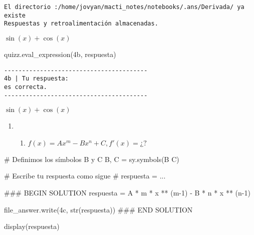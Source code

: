 \documentclass[
  letterpaper,
  DIV=11,
  numbers=noendperiod]{scrreprt}
\newenvironment{Shaded}{\begin{snugshade}}{\end{snugshade}}
\newcommand{\BuiltInTok}[1]{\textcolor[rgb]{0.00,0.23,0.31}{#1}}
\newcommand{\CommentTok}[1]{\textcolor[rgb]{0.37,0.37,0.37}{#1}}
\newcommand{\DecValTok}[1]{\textcolor[rgb]{0.68,0.00,0.00}{#1}}
\newcommand{\NormalTok}[1]{\textcolor[rgb]{0.00,0.23,0.31}{#1}}
\newcommand{\OperatorTok}[1]{\textcolor[rgb]{0.37,0.37,0.37}{#1}}
\newcommand{\RegionMarkerTok}[1]{\textcolor[rgb]{0.00,0.23,0.31}{#1}}
\newcommand{\StringTok}[1]{\textcolor[rgb]{0.13,0.47,0.30}{#1}}
\providecommand{\tightlist}{%
  \setlength{\itemsep}{0pt}\setlength{\parskip}{0pt}}\usepackage{longtable,booktabs,array}
\begin{document}
\begin{verbatim}
El directorio :/home/jovyan/macti_notes/notebooks/.ans/Derivada/ ya existe
Respuestas y retroalimentación almacenadas.
\end{verbatim}

$\displaystyle \sin{\left(x \right)} + \cos{\left(x \right)}$

\begin{Shaded}
\begin{Highlighting}[]
\NormalTok{quizz.eval\_expression(}\StringTok{\textquotesingle{}4b\textquotesingle{}}\NormalTok{, respuesta)}
\end{Highlighting}
\end{Shaded}

\begin{verbatim}
----------------------------------------
4b | Tu respuesta:
es correcta.
----------------------------------------
\end{verbatim}

$\displaystyle \sin{\left(x \right)} + \cos{\left(x \right)}$

\begin{enumerate}
\def\labelenumi{\arabic{enumi}.}
\setcounter{enumi}{3}
\tightlist
\item
  \begin{enumerate}
  \def\labelenumii{\alph{enumii}.}
  \setcounter{enumii}{2}
  \tightlist
  \item
    \(f(x) = Ax^{m}-Bx^{n}+C, f'(x) = ¿?\)
  \end{enumerate}
\end{enumerate}

\begin{Shaded}
\begin{Highlighting}[]
\CommentTok{\# Definimos los símbolos B y C}
\NormalTok{B, C }\OperatorTok{=}\NormalTok{ sy.symbols(}\StringTok{\textquotesingle{}B C\textquotesingle{}}\NormalTok{)}

\CommentTok{\# Escribe tu respuesta como sigue }
\CommentTok{\# respuesta = ...}

\CommentTok{\#\#\# }\RegionMarkerTok{BEGIN}\CommentTok{ SOLUTION}
\NormalTok{respuesta }\OperatorTok{=}\NormalTok{ A }\OperatorTok{*}\NormalTok{ m }\OperatorTok{*}\NormalTok{ x }\OperatorTok{**}\NormalTok{ (m}\OperatorTok{{-}}\DecValTok{1}\NormalTok{) }\OperatorTok{{-}}\NormalTok{ B }\OperatorTok{*}\NormalTok{ n }\OperatorTok{*}\NormalTok{ x }\OperatorTok{**}\NormalTok{ (n}\OperatorTok{{-}}\DecValTok{1}\NormalTok{)}

\NormalTok{file\_answer.write(}\StringTok{\textquotesingle{}4c\textquotesingle{}}\NormalTok{, }\BuiltInTok{str}\NormalTok{(respuesta))}
\CommentTok{\#\#\# }\RegionMarkerTok{END}\CommentTok{ SOLUTION}

\NormalTok{display(respuesta)}
\end{Highlighting}
\end{Shaded}
\end{document}
